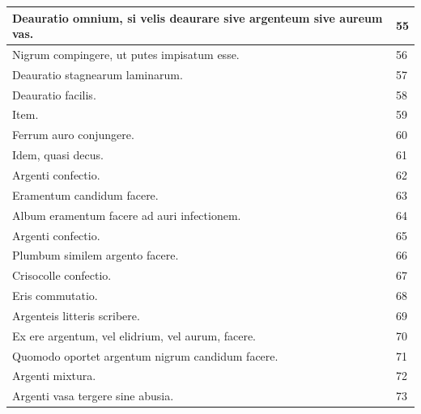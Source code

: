 \documentclass[a4paper, 11pt, oneside, polutonikogreek, italian]{article}
\begin{document}
\begin{center}
\begin{longtable}{|p{60mm}|l|}
         Deauratio omnium, si velis deaurare sive argenteum sive aureum vas.             & 55 \\ \hline
         Nigrum compingere, ut putes impisatum esse.                                     & 56 \\ \hline
         Deauratio stagnearum laminarum.                                                 & 57 \\ \hline
         Deauratio facilis.                                                              & 58 \\ \hline
         Item.                                                                           & 59 \\ \hline
         Ferrum auro conjungere.                                                         & 60 \\ \hline
         Idem, quasi decus.                                                              & 61 \\ \hline
         Argenti confectio.                                                              & 62 \\ \hline
         Eramentum candidum facere.                                                      & 63 \\ \hline
         Album eramentum facere ad auri infectionem.                                     & 64 \\ \hline
         Argenti confectio.                                                              & 65 \\ \hline
         Plumbum similem argento facere.                                                 & 66 \\ \hline
         Crisocolle confectio.                                                           & 67 \\ \hline
         Eris commutatio.                                                                & 68 \\ \hline
         Argenteis litteris scribere.                                                    & 69 \\ \hline
         Ex ere argentum, vel elidrium, vel aurum, facere.                               & 70 \\ \hline
         Quomodo oportet argentum nigrum candidum facere.                                & 71 \\ \hline
         Argenti mixtura.                                                                & 72 \\ \hline
         Argenti vasa tergere sine abusia.                                               & 73 \\ \hline

\end{longtable}
\end{center}
\end{document}
